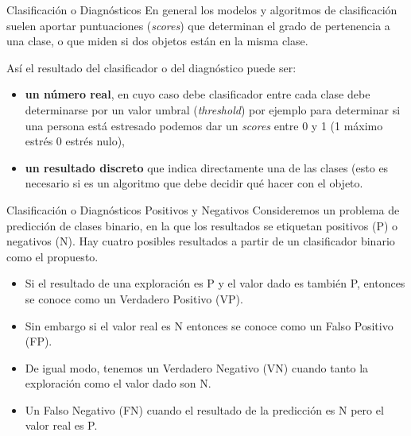 \documentclass[
  ignorenonframetext,
  aspectratio=169]{beamer}
\providecommand{\tightlist}{%
  \setlength{\itemsep}{0pt}\setlength{\parskip}{0pt}}\usepackage{longtable,booktabs,array}
\begin{document}
\begin{frame}{Clasificación o Diagnósticos}
\label{clasificaciuxf3n-o-diagnuxf3sticos-2}
En general los modelos y algoritmos de clasificación suelen aportar
puntuaciones (\emph{scores}) que determinan el grado de pertenencia a
una clase, o que miden si dos objetos están en la misma clase.

Así el resultado del clasificador o del diagnóstico puede ser:

\begin{itemize}
\tightlist
\item
  \textbf{un número real}, en cuyo caso debe clasificador entre cada
  clase debe determinarse por un valor umbral (\emph{threshold}) por
  ejemplo para determinar si una persona está estresado podemos dar un
  \emph{scores} entre 0 y 1 (1 máximo estrés 0 estrés nulo),
\item
  \textbf{un resultado discreto} que indica directamente una de las
  clases (esto es necesario si es un algoritmo que debe decidir qué
  hacer con el objeto.
\end{itemize}
\end{frame}

\begin{frame}{Clasificación o Diagnósticos}
\label{clasificaciuxf3n-o-diagnuxf3sticos-3}
Positivos y Negativos Consideremos un problema de predicción de clases
binario, en la que los resultados se etiquetan positivos (P) o negativos
(N). Hay cuatro posibles resultados a partir de un clasificador binario
como el propuesto.

\begin{itemize}
\tightlist
\item
  Si el resultado de una exploración es P y el valor dado es también P,
  entonces se conoce como un Verdadero Positivo (VP).
\item
  Sin embargo si el valor real es N entonces se conoce como un Falso
  Positivo (FP).
\item
  De igual modo, tenemos un Verdadero Negativo (VN) cuando tanto la
  exploración como el valor dado son N.
\item
  Un Falso Negativo (FN) cuando el resultado de la predicción es N pero
  el valor real es P.
\end{itemize}
\end{frame}
\end{document}
